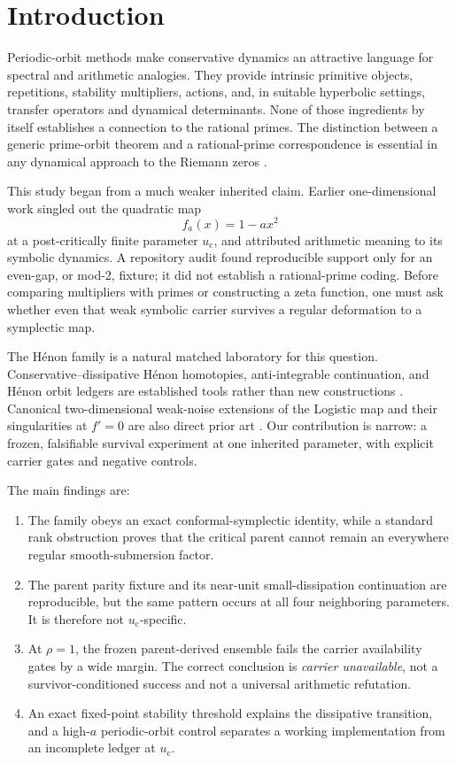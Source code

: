 \documentclass[11pt]{article}
\newcommand{\uc}{u_{\mathrm c}}
\begin{document}
\section{Introduction}

Periodic-orbit methods make conservative dynamics an attractive language for
spectral and arithmetic analogies. They provide intrinsic primitive objects,
repetitions, stability multipliers, actions, and, in suitable hyperbolic
settings, transfer operators and dynamical determinants. None of those
ingredients by itself establishes a connection to the rational primes.
The distinction between a generic prime-orbit theorem and a rational-prime
correspondence is essential in any dynamical approach to the Riemann zeros
\citep{berry1999riemann,rugh1996fredholm}.

This study began from a much weaker inherited claim. Earlier one-dimensional
work singled out the quadratic map
\[
 f_a(x)=1-a x^2
\]
at a post-critically finite parameter \(\uc\), and attributed arithmetic
meaning to its symbolic dynamics. A repository audit found reproducible
support only for an even-gap, or mod-2, fixture; it did not establish a
rational-prime coding. Before comparing multipliers with primes or
constructing a zeta function, one must ask whether even that weak symbolic
carrier survives a regular deformation to a symplectic map.

The H\'enon family is a natural matched laboratory for this question.
Conservative--dissipative H\'enon homotopies, anti-integrable continuation,
and H\'enon orbit ledgers are established tools rather than new constructions
\citep{heagy1992physical,sterling1998antiintegrable,arai2025antiintegrability,
gallas2007counting,sattari2017transport}. Canonical two-dimensional weak-noise
extensions of the Logistic map and their singularities at \(f'=0\) are also
direct prior art \citep{fogedby2005weak,demaeyer2009escape}. Our contribution
is narrow: a frozen, falsifiable survival experiment at one inherited
parameter, with explicit carrier gates and negative controls.

The main findings are:
\begin{enumerate}
 \item The family obeys an exact conformal-symplectic identity, while a
 standard rank obstruction proves that the critical parent cannot remain an
 everywhere regular smooth-submersion factor.
 \item The parent parity fixture and its near-unit small-dissipation
 continuation are reproducible, but the same pattern occurs at all four
 neighboring parameters. It is therefore not \(\uc\)-specific.
 \item At \(\rho=1\), the frozen parent-derived ensemble fails the carrier
 availability gates by a wide margin. The correct conclusion is
 \emph{carrier unavailable}, not a survivor-conditioned success and not a
 universal arithmetic refutation.
 \item An exact fixed-point stability threshold explains the dissipative
 transition, and a high-\(a\) periodic-orbit control separates a working
 implementation from an incomplete ledger at \(\uc\).
\end{enumerate}
\end{document}
